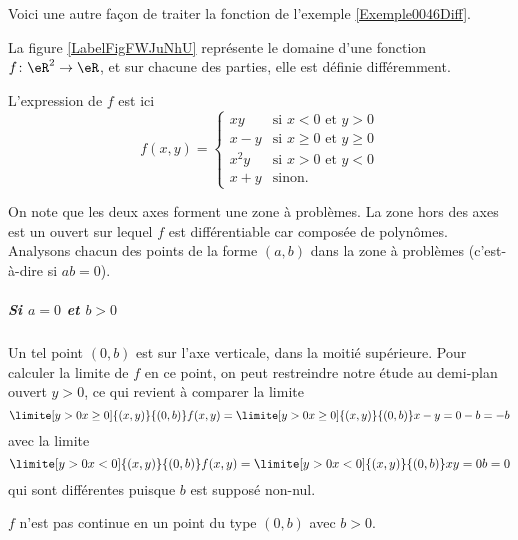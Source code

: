 Voici une autre façon de traiter la fonction de l'exemple \ref{Exemple0046Diff}.

\begin{example} \label{ExeFHmCLII}
    La figure \ref{LabelFigFWJuNhU} représente le domaine d'une fonction $f\colon \eR^2\to \eR$, et sur chacune des parties, elle est définie différemment.
    \newcommand{\CaptionFigFWJuNhU}{La fonction de l'exemple \ref{ExeFHmCLII}.}


L'expression de $f$ est ici
\begin{equation}
  f(x,y) =
  \begin{cases}
    xy & \text{si $x < 0$ et $y > 0$}\\
    x-y & \text{si $x \geq 0$ et $y \geq 0$}\\
    x^2y & \text{si $x > 0$ et $y < 0$}\\
    x+y & \text{sinon.}
  \end{cases}
\end{equation}

On note que les deux axes forment une zone à problèmes. La zone hors
des axes est un ouvert sur lequel $f$ est différentiable car composée
de polynômes. Analysons chacun des points de la forme $(a,b)$ dans la
zone à problèmes (c'est-à-dire si $ab = 0$).

\subparagraph{Si $a = 0$ et $b > 0$} Un tel point $(0,b)$ est sur
l'axe verticale, dans la moitié supérieure. Pour calculer la limite de
$f$ en ce point, on peut restreindre notre étude au demi-plan ouvert
$y > 0$, ce qui revient à comparer la limite
\begin{equation*}
  \limite[y>0\\x\geq 0] {(x,y)} {(0,b)} f(x,y) =   \limite[y>0\\x\geq
  0] {(x,y)} {(0,b)} x-y = 0 - b = -b
\end{equation*}
avec la limite
\begin{equation*}
  \limite[y>0\\x<0] {(x,y)} {(0,b)} f(x,y) =   \limite[y>0\\x<0]
  {(x,y)} {(0,b)} xy = 0 b = 0
\end{equation*}
qui sont différentes puisque $b$ est supposé non-nul.

\conclusion $f$ n'est pas continue en un point du type $(0,b)$ avec $b
> 0$.


\end{example}
